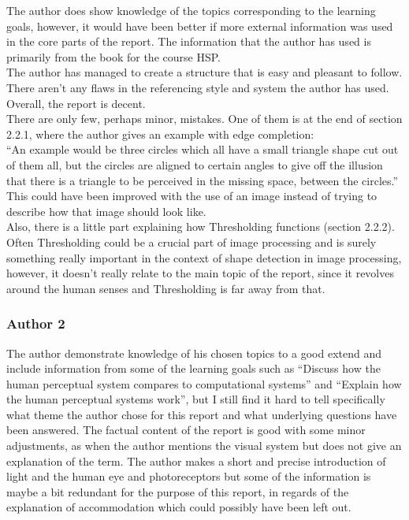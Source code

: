 \documentclass{article}
\begin{document}
The author does show knowledge of the topics corresponding to the learning goals, however, it would have been better if more external information was used in the core parts of the report. The information that the author has used is primarily from the book for the course HSP.\\

The author has managed to create a structure that is easy and pleasant to follow.\\

There aren’t any flaws in the referencing style and system the author has used.\\

Overall, the report is decent.\\

There are only few, perhaps minor, mistakes. One of them is at the end of section 2.2.1, where the author gives an example with edge completion:\\

“An example would be three circles which all have a small triangle shape cut out of them all, but the circles are aligned to certain angles to give off the illusion that there is a triangle to be perceived in the missing space, between the circles.”\\

This could have been improved with the use of an image instead of trying to describe how that image should look like.\\

Also, there is a little part explaining how Thresholding functions (section 2.2.2). Often Thresholding could be a crucial part of image processing and is surely something really important in the context of shape detection in image processing, however, it doesn’t really relate to the main topic of the report, since it revolves around the human senses and Thresholding is far away from that.\\

\subsubsection{Author 2}

The author demonstrate knowledge of his chosen topics to a good extend and include information from some of the learning goals such as “Discuss how the human perceptual system compares to computational systems” and “Explain how the human perceptual systems work”, but I still find it hard to tell specifically what theme the author chose for this report and what underlying questions have been answered.
The factual content of the report is good with some minor adjustments, as when the author mentions the visual system but does not give an explanation of the term. The author makes a short and precise introduction of light and the human eye and photoreceptors but some of the information is maybe a bit redundant for the purpose of this report, in regards of the explanation of accommodation which could possibly have been left out.\\
\end{document}
